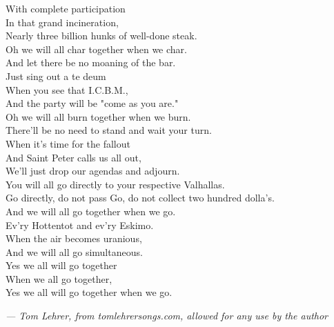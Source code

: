 \begin{commentary}
\begin{multicols}{2}
With complete participation\\
In that grand incineration,\\
Nearly three billion hunks of well-done steak.\\[0.5em]
Oh we will all char together when we char.\\
And let there be no moaning of the bar.\\
Just sing out a te deum\\
When you see that I.C.B.M.,\\
And the party will be "come as you are."\\[0.5em]
Oh we will all burn together when we burn.\\
There'll be no need to stand and wait your turn.\\
When it's time for the fallout\\
And Saint Peter calls us all out,\\
We'll just drop our agendas and adjourn.\\[0.5em]
You will all go directly to your respective Valhallas.\\
Go directly, do not pass Go, do not collect two hundred dolla's.\\[0.5em]
And we will all go together when we go.\\
Ev'ry Hottentot and ev'ry Eskimo.\\
When the air becomes uranious,\\
And we will all go simultaneous.\\
Yes we all will go together\\
When we all go together,\\
Yes we all will go together when we go.
\end{multicols}

\normalsize\hfill\textit{— Tom Lehrer, from tomlehrersongs.com, allowed for any use by the author}
\end{commentary}
